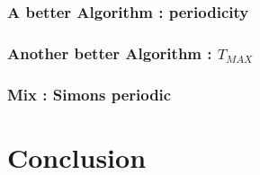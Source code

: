\documentclass[a4paper,10pt]{article}
\begin{document}
     \subsubsection{A better Algorithm : periodicity}
     
     \subsubsection{Another better Algorithm : $T_{MAX}$}
     
     \subsubsection{Mix : Simons periodic}
     
	
   
\section{Conclusion}





\end{document}
